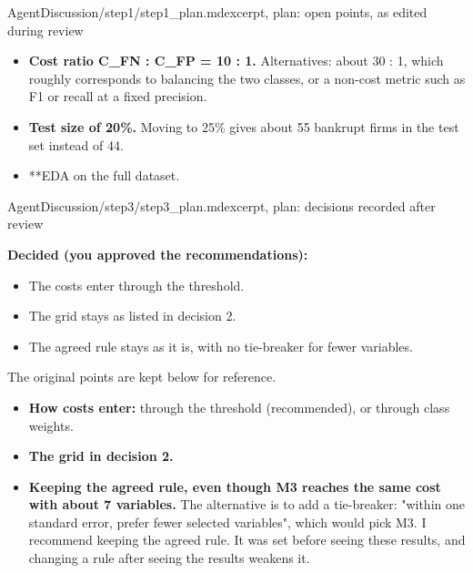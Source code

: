 \begin{mdfile}{AgentDiscussion/step1/step1\_plan.md}{excerpt, plan: open points, as edited during review}

\begin{itemize}
\tightlist
\item
  \textbf{Cost ratio C\_FN : C\_FP = 10 : 1.} Alternatives: about 30 : 1, which roughly corresponds to balancing the two classes, or a non-cost metric such as F1 or recall at a fixed precision.
\item
  \textbf{Test size of 20\%.} Moving to 25\% gives about 55 bankrupt firms in the test set instead of 44.
\item
  **EDA on the full dataset.
\end{itemize}
\end{mdfile}

\begin{mdfile}{AgentDiscussion/step3/step3\_plan.md}{excerpt, plan: decisions recorded after review}

\textbf{Decided (you approved the recommendations):}

\begin{itemize}
\tightlist
\item
  The costs enter through the threshold.
\item
  The grid stays as listed in decision 2.
\item
  The agreed rule stays as it is, with no tie-breaker for fewer variables.
\end{itemize}

The original points are kept below for reference.

\begin{itemize}
\tightlist
\item
  \textbf{How costs enter:} through the threshold (recommended), or through class weights.
\item
  \textbf{The grid in decision 2.}
\item
  \textbf{Keeping the agreed rule, even though M3 reaches the same cost with about 7 variables.} The alternative is to add a tie-breaker: "within one standard error, prefer fewer selected variables", which would pick M3. I recommend keeping the agreed rule. It was set before seeing these results, and changing a rule after seeing the results weakens it.
\end{itemize}
\end{mdfile}

